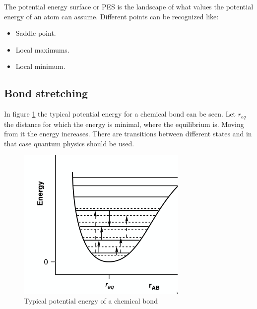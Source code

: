 The potential energy surface or PES is the landscape of what values the potential energy of an atom can assume.
Different points can be recognized like:

\begin{multicols}{2}
	\begin{itemize}
		\item Saddle point.
		\item Local maximums.
		\item Local minimum.
	\end{itemize}
\end{multicols}

	\subsection{Bond stretching}
	In figure \ref{fig:chem-bond} the typical potential energy for a chemical bond can be seen.
	Let $r_{eq}$ the distance for which the energy is minimal, where the equilibrium is.
	Moving from it the energy increases.
	There are transitions between different states and in that case quantum physics should be used.

	\begin{figure}[H]
		\includegraphics[width=\textwidth]{chem-bond}
		\caption{Typical potential energy of a chemical bond}
		\label{fig:chem-bond}
	\end{figure}


